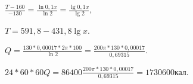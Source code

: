 \documentclass{article}
\begin{document}
\begin{center}
    $\frac{T - 160}{-130} = \frac{\ln 0,1x}{\ln 2} = \frac{\lg 0,1x}{\lg 2},$
\end{center}

\begin{center}
    $T = 591,8 - 431,8 \lg x.$
\end{center}


\begin{center}
    $ Q = \frac{130*0,00017*2\pi * 100}{\ln 2} = \frac{200 \pi * 130 * 0,00017}{0,69315}. $
\end{center}


\begin{center}
    $24*60*60Q = 86400 \frac{200 \pi * 130 * 0,00017}{0,69315} = 1 730 600\textit{кал.}$
\end{center}
\end{document}
